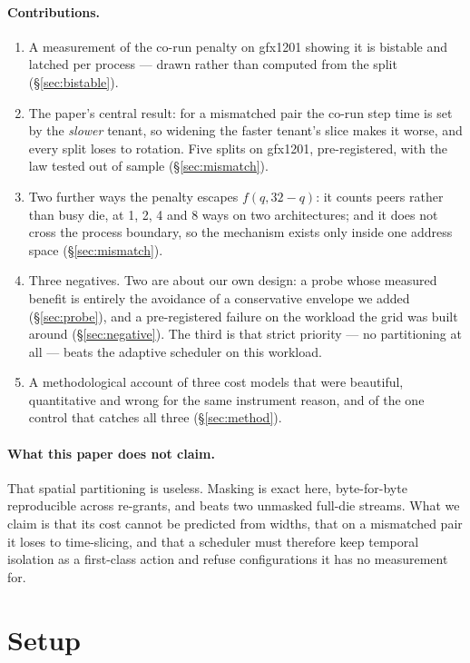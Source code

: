 \documentclass[sigconf,nonacm]{acmart}
\begin{document}
\paragraph{Contributions.}
\begin{enumerate}
\item A measurement of the co-run penalty on gfx1201 showing it is
  bistable and latched per process --- drawn rather than computed from
  the split (\S\ref{sec:bistable}).
\item The paper's central result: for a mismatched pair the co-run step
  time is set by the \emph{slower} tenant, so widening the faster
  tenant's slice makes it worse, and every split loses to rotation. Five
  splits on gfx1201, pre-registered, with the law tested out of sample
  (\S\ref{sec:mismatch}).
\item Two further ways the penalty escapes $f(q, 32-q)$: it counts peers
  rather than busy die, at 1, 2, 4 and 8 ways on two architectures; and
  it does not cross the process boundary, so the mechanism exists only
  inside one address space (\S\ref{sec:mismatch}).
\item Three negatives. Two are about our own design: a probe whose
  measured benefit is entirely the avoidance of a conservative envelope
  we added (\S\ref{sec:probe}), and a pre-registered failure on the
  workload the grid was built around (\S\ref{sec:negative}). The third is
  that strict priority --- no partitioning at all --- beats the adaptive
  scheduler on this workload.
\item A methodological account of three cost models that were beautiful,
  quantitative and wrong for the same instrument reason, and of the one
  control that catches all three (\S\ref{sec:method}).
\end{enumerate}

\paragraph{What this paper does not claim.} That spatial partitioning is
useless. Masking is exact here, byte-for-byte reproducible across
re-grants, and beats two unmasked full-die streams. What we claim is that
its cost cannot be predicted from widths, that on a mismatched pair it
loses to time-slicing, and that a scheduler must therefore keep temporal
isolation as a first-class action and refuse configurations it has no
measurement for.

\section{Setup}
\end{document}
